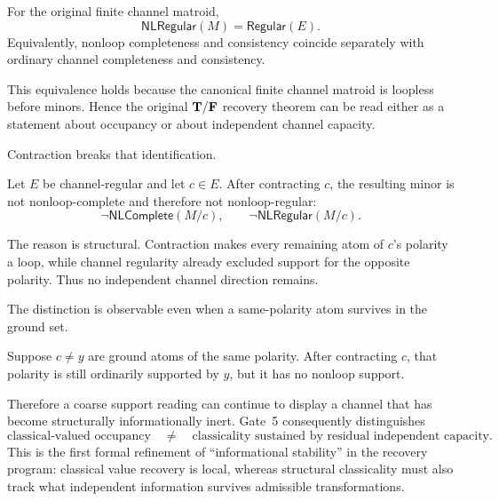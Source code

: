\begin{theorem}
\label{thm:nonloop-regularity-before-minors}
For the original finite channel matroid,
\[
  \mathsf{NLRegular}(M)=\mathsf{Regular}(E).
\]
Equivalently, nonloop completeness and consistency coincide separately with ordinary
channel completeness and consistency.
\statusverified
\end{theorem}

This equivalence holds because the canonical finite channel matroid is loopless before
minors.  Hence the original \(\mathbf{T}/\mathbf{F}\) recovery theorem can be read either as a
statement about occupancy or about independent channel capacity.

Contraction breaks that identification.

\begin{theorem}
\label{thm:contraction-destroys-nonloop-regularity}
Let \(E\) be channel-regular and let \(c\in E\).  After contracting \(c\), the
resulting minor is not nonloop-complete and therefore not nonloop-regular:
\[
  \neg\mathsf{NLComplete}(M/c),
  \qquad
  \neg\mathsf{NLRegular}(M/c).
\]
\statusverified
\end{theorem}

The reason is structural.  Contraction makes every remaining atom of \(c\)'s polarity
a loop, while channel regularity already excluded support for the opposite polarity.
Thus no independent channel direction remains.

The distinction is observable even when a same-polarity atom survives in the ground
set.

\begin{proposition}
\label{prop:occupancy-without-capacity}
Suppose \(c\neq y\) are ground atoms of the same polarity.  After contracting \(c\),
that polarity is still ordinarily supported by \(y\), but it has no nonloop support.
\statusverified
\end{proposition}

Therefore a coarse support reading can continue to display a channel that has become
structurally informationally inert.  Gate~5 consequently distinguishes
\[
  \boxed{
  \text{classical-valued occupancy}
  \quad\neq\quad
  \text{classicality sustained by residual independent capacity}.}
\]
This is the first formal refinement of ``informational stability'' in the recovery
program: classical value recovery is local, whereas structural classicality must also
track what independent information survives admissible transformations.

